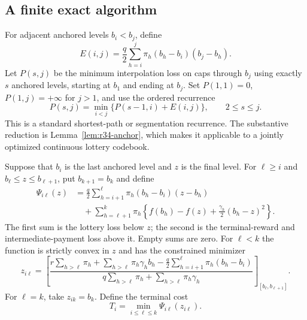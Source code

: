 \subsection{A finite exact algorithm}
For adjacent anchored levels $b_i<b_j$, define
\begin{equation}\label{eq:r34-edge}
 E(i,j)=\frac q2\sum_{h=i}^{j}\pi_h(b_h-b_i)(b_j-b_h).
\end{equation}
Let $P(s,j)$ be the minimum interpolation loss on caps through $b_j$ using exactly $s$ anchored levels, starting at $b_1$ and ending at $b_j$. Set $P(1,1)=0$, $P(1,j)=+\infty$ for $j>1$, and use the ordered recurrence
\begin{equation}\label{eq:r34-prefix}
 P(s,j)=\min_{i<j}\{P(s-1,i)+E(i,j)\},\qquad 2\leq s\leq j.
\end{equation}
This is a standard shortest-path or segmentation recurrence. The substantive reduction is Lemma~\ref{lem:r34-anchor}, which makes it applicable to a jointly optimized continuous lottery codebook.

Suppose that $b_i$ is the last anchored level and $z$ is the final level. For $\ell\geq i$ and $b_\ell\leq z\leq b_{\ell+1}$, put $b_{k+1}=b_k$ and define
\begin{align}
 \Psi_{i\ell}(z)
 &=\frac q2\sum_{h=i+1}^{\ell}\pi_h(b_h-b_i)(z-b_h)\nonumber\\
 &\quad+\sum_{h=\ell+1}^{k}\pi_h
 \left\{f(b_h)-f(z)+\frac{\gamma_h}{2}(b_h-z)^2\right\}.
 \label{eq:r34-tail}
\end{align}
The first sum is the lottery loss below $z$; the second is the terminal-reward and intermediate-payment loss above it. Empty sums are zero. For $\ell<k$ the function is strictly convex in $z$ and has the constrained minimizer
\begin{equation}\label{eq:r34-top}
 z_{i\ell}=\left[
 \frac{r\sum_{h>\ell}\pi_h+\sum_{h>\ell}\pi_h\gamma_hb_h
       -\frac q2\sum_{h=i+1}^{\ell}\pi_h(b_h-b_i)}
      {q\sum_{h>\ell}\pi_h+\sum_{h>\ell}\pi_h\gamma_h}
 \right]_{[b_\ell,b_{\ell+1}]}.
\end{equation}
For $\ell=k$, take $z_{ik}=b_k$. Define the terminal cost
\begin{equation}\label{eq:r34-T}
 T_i=\min_{i\leq\ell\leq k}\Psi_{i\ell}(z_{i\ell}).
\end{equation}

